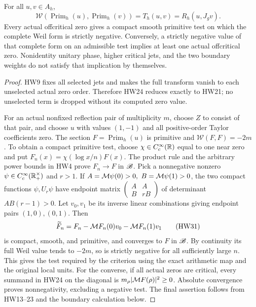 \begin{theorem}\label{hw:globalbridge}
For all \(u,v\in A_h\),
\[
 \mathcal W(\operatorname{Prim}_h(u),
             \operatorname{Prim}_h(v))
        =T_h(u,v)=R_h(u,J_gv).
 \tag{HW30}\label{hw:bridge}
\]
Every actual offcritical zero gives a compact smooth primitive
test on which the complete Weil form is strictly negative.
Conversely, a strictly negative value of that complete form on
an admissible test implies at least one actual offcritical zero.
Nonidentity unitary phase, higher critical jets, and the two
boundary weights do not satisfy that implication by themselves.
\end{theorem}
\begin{proof}
HW9 fixes all selected jets and makes the full transform vanish
to each unselected actual zero order. Therefore HW24 reduces
exactly to HW21; no unselected term is dropped without its
computed zero value.

For an actual nonfixed reflection pair of multiplicity \(m\),
choose \(Z\) to consist of that pair, and choose \(u\) with
values \((1,-1)\) and all positive-order Taylor coefficients
zero. The section \(F=\operatorname{Prim}_h(u)\) is primitive
and \(\mathcal W(F,F)=-2m\).
To obtain a compact primitive test, choose
\(\chi\in C_c^\infty(\mathbb R)\) equal to one near zero and put
\(F_n(x)=\chi(\log x/n)F(x)\).
The product rule and the arbitrary power bounds in HW4
prove \(F_n\to F\) in \(\mathscr B\).
Pick a nonnegative nonzero \(\psi\in C_c^\infty(\mathbb R_+^\times)\)
and \(r>1\). If \(A=\M\psi(0)>0,\ B=\M\psi(1)>0\),
the two compact functions \(\psi,U_r\psi\) have endpoint
matrix \(\left(\begin{smallmatrix}A&A\\ B&rB\end{smallmatrix}\right)\)
of determinant \(AB(r-1)>0\).
Let \(v_0,v_1\) be its inverse linear combinations giving
endpoint pairs \((1,0),(0,1)\).
Then
\[
 \widetilde F_n=F_n-\mathcal M F_n(0)v_0-\mathcal M F_n(1)v_1
 \tag{HW31}
\]
is compact, smooth, and primitive, and converges to \(F\)
in \(\mathscr B\). By continuity its full Weil value tends to
\(-2m\), so is strictly negative for all sufficiently large
\(n\). This gives the test required by the criterion using
the exact arithmetic map and the original local units.
For the converse, if all actual zeros are critical, every
summand in HW24 on the diagonal is
\(m_\rho|\mathcal M F(\rho)|^2\ge0\).
Absolute convergence proves nonnegativity, excluding a
negative test. The final assertion follows from HW13--23
and the boundary calculation below.
\end{proof}

